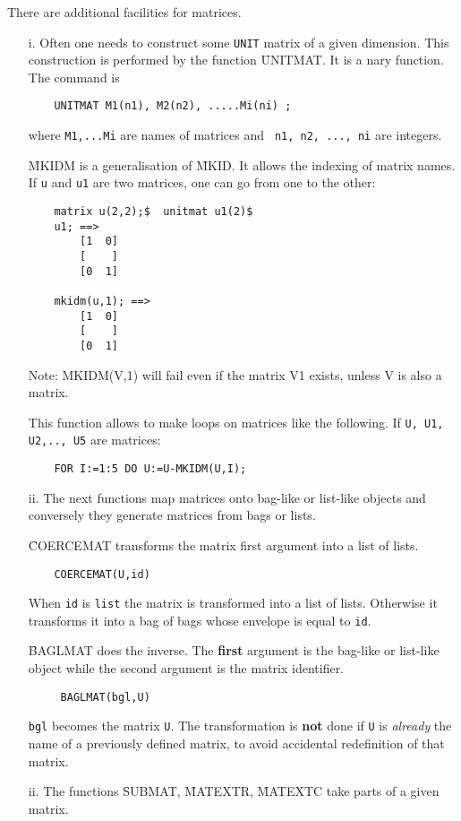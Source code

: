 There are additional facilities for matrices.
\begin{itemize}
\item[i.]
Often one needs to construct some {\tt UNIT} matrix of
a given dimension.  This construction is performed by the function
\f{UNITMAT}.  It is a nary function.  The command is
\begin{verbatim}
	UNITMAT M1(n1), M2(n2), .....Mi(ni) ;
\end{verbatim}
where \verb+M1,...Mi+ are names of matrices and
\verb+ n1, n2, ..., ni+ are integers.

\f{MKIDM} is a generalisation of
\f{MKID}.  It allows the indexing of matrix names.  If
\verb+u+ and \verb+u1+ are two matrices, one can go from one to the
other:
\begin{verbatim}
	matrix u(2,2);$  unitmat u1(2)$
	u1; ==>
		[1  0]
		[    ]
		[0  1]

	mkidm(u,1); ==>
		[1  0]
		[    ]
		[0  1]
\end{verbatim}
Note: MKIDM(V,1) will fail even if the matrix V1 exists, unless V is
also a matrix.

This function allows to make loops on matrices like the following.
If \verb+U, U1, U2,.., U5+ are matrices:
\begin{verbatim}
	FOR I:=1:5 DO U:=U-MKIDM(U,I);
\end{verbatim}
\item[ii.]
The next functions map matrices onto bag-like or list-like objects
and conversely they generate matrices from bags or lists.

\f{COERCEMAT} transforms the matrix first argument
into a list of lists.
\begin{verbatim}
	COERCEMAT(U,id)
\end{verbatim}
When \verb+id+ is \verb+list+ the matrix is transformed into a list of
lists.  Otherwise it transforms it into a bag of bags whose envelope is
equal to \verb+id+.

\f{BAGLMAT} does the inverse. The {\bf first}
argument is the bag-like or list-like object while the second argument
is the matrix identifier.
\begin{verbatim}
	 BAGLMAT(bgl,U)
\end{verbatim}
\verb+bgl+ becomes the matrix \verb+U+. The transformation is
{\bf not} done if \verb+U+ is {\em already} the name of a
previously defined matrix,  to avoid accidental redefinition
of that matrix.
\item[ii.]
The functions \f{SUBMAT},
\f{MATEXTR}, \f{MATEXTC} take parts
of a given matrix.


\end{itemize}
